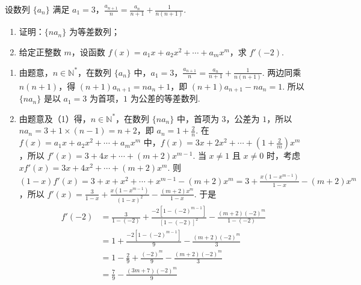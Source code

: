 \begin{problem}
设数列 \(\{a_n\}\) 满足 \(a_1 = 3\)，\(\frac{a_{n+1}}{n} = \frac{a_n}{n+1} + \frac{1}{n(n+1)}\).

\begin{enumerate}
\item 证明：\(\{na_n\}\) 为等差数列；
\item 给定正整数 \(m\)，设函数 \(f(x) = a_1x + a_2x^2 + \cdots + a_mx^m\)，求 \(f'(-2)\).
\end{enumerate}
\end{problem}

\begin{solution}
\begin{enumerate}
\item 由题意，\(n \in \mathbb{N}^*\)，在数列 \(\{a_n\}\) 中，\(a_1 = 3\)，\(\frac{a_{n+1}}{n} = \frac{a_n}{n+1} + \frac{1}{n(n+1)}\). 两边同乘 \(n(n+1)\)，得 \((n+1)a_{n+1} = na_n + 1\)，即 \((n+1)a_{n+1} - na_n = 1\). 所以 \(\{na_n\}\) 是以 \(a_1 = 3\) 为首项，\(1\) 为公差的等差数列.

\item 由题意及（1）得，\(n \in \mathbb{N}^*\)，在数列 \(\{na_n\}\) 中，首项为 \(3\)，公差为 \(1\)，所以 \(na_n = 3 + 1 \times (n-1) = n+2\)，即 \(a_n = 1 + \frac{2}{n}\). 在 \(f(x) = a_1x + a_2x^2 + \cdots + a_mx^m\) 中，\(f(x) = 3x + 2x^2 + \cdots + \left(1 + \frac{2}{m}\right)x^m\)，所以 \(f'(x) = 3 + 4x + \cdots + (m+2)x^{m-1}\). 当 \(x \neq 1\) 且 \(x \neq 0\) 时，考虑 \(xf'(x) = 3x + 4x^2 + \cdots + (m+2)x^m\). 则 \((1-x)f'(x)=3+x+x^2+\cdots+x^{m-1}-(m+2)x^m=3+\frac{x(1-x^{m-1})}{1-x}-(m+2)x^m\)，所以 \(f'(x) = \frac{3}{1-x} + \frac{x(1-x^{m-1})}{(1-x)^2} - \frac{(m+2)x^m}{1-x}\).
于是
\begin{align*}
f'(-2)
&= \frac{3}{1-(-2)} + \frac{-2[1-(-2)^{m-1}]}{[1-(-2)]^2} - \frac{(m+2)(-2)^m}{1-(-2)} \\
&= 1 + \frac{-2[1-(-2)^{m-1}]}{9} - \frac{(m+2)(-2)^m}{3} \\
&= 1 - \frac{2}{9} + \frac{(-2)^m}{9} - \frac{(m+2)(-2)^m}{3} \\
&= \frac{7}{9} - \frac{(3m+7)(-2)^m}{9}
\end{align*}
\end{enumerate}
\end{solution}

